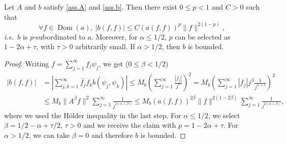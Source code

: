 \begin{lemma}\label{lem.sub}
Let $A$ and $b$ satisfy \eqref{ass.A} and \eqref{ass.b}.
Then there exist $0 \leq p <1$ and $C>0$ such that  
\begin{equation*}
\forall f \in {{\operatorname{Dom}}}(a), \ |b(f,f)| \leq C \left( a(f,f) \right)^p \|f\|^{2(1-p)},
\end{equation*}
{{\emph{i.e.}}}~$b$ is $p$-subordinated to $a$. Moreover, for $\alpha \leq 1/2$, $p$ can be selected as $1-2\alpha + \tau$, with $\tau >0$ arbitrarily small. If $\alpha>1/2$, then $b$ is bounded.
\end{lemma}
\begin{proof}
Writing $f= \sum_{j=1}^{\infty} f_j \psi_j$, we get ($0\leq\beta < 1/2$)
\begin{equation*}
\begin{aligned}
|b(f,f)| & = 
\left| 
\sum_{j,k=1}^{\infty} \overline{f}_j f_k b(\psi_j,\psi_k)  \right| 
\leq 
M_b 
\left(
\sum_{j=1}^{\infty} \frac{|f_j|}{j^{\alpha}} 
\right)^2
= 
M_b 
\left(
\sum_{j=1}^{\infty} |f_j|j^{\beta} \frac{1}{j^{\alpha+\beta}}  
\right)^2
\\ 
& 
\leq  
M_b \|A^{\beta} f\|^2 
\sum_{j=1}^{\infty} \frac{1}{j^{2(\alpha+\beta)}}
\leq 
M_b (a(f,f))^{2\beta} \|f\|^{2(1-2\beta)} 
\sum_{j=1}^{\infty} \frac{1}{j^{2(\alpha+\beta)}}, 
\end{aligned}
\end{equation*}
where we used the H\"older inequality in the last step.
For $\alpha \leq 1/2$, we select $\beta=1/2-\alpha + \tau/2$, $\tau >0$ and we receive the claim with $p=1-2\alpha + \tau$. For $\alpha > 1/2$, we can take $\beta=0$ and therefore $b$ is bounded.
\end{proof}

